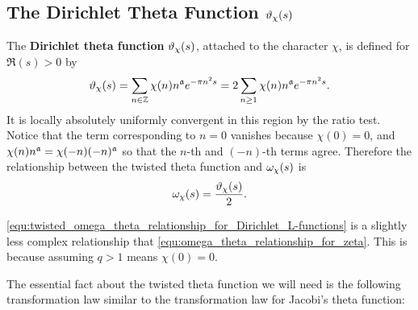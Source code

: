     \subsection*{The Dirichlet Theta Function \texorpdfstring{$\vartheta_{\chi}(s)$}{\vt_{\chi}(s)}}
      The \textbf{Dirichlet theta function} $\vartheta_{\chi}(s)$, attached to the character $\chi$, is defined for $\Re(s) > 0$ by
      \[
        \vartheta_{\chi}(s) = \sum_{n \in \mathbb{Z}}\chi(n)n^{\mathfrak{a}}e^{-\pi n^{2}s} = 2\sum_{n \ge 1}\chi(n)n^{\mathfrak{a}}e^{-\pi n^{2}s}.
      \]
      It is locally absolutely uniformly convergent in this region by the ratio test. Notice that the term corresponding to $n = 0$ vanishes because $\chi(0) = 0$, and $\chi(n)n^{\mathfrak{a}} = \chi(-n)(-n)^{\mathfrak{a}}$ so that the $n$-th and $(-n)$-th terms agree. Therefore the relationship between the twisted theta function and $\omega_{\chi}(s)$ is
      \begin{equation}\label{equ:twisted_omega_theta_relationship_for_Dirichlet_L-functions}
        \omega_{\chi}(s) = \frac{\vartheta_{\chi}(s)}{2}.
      \end{equation}

      \begin{remark}
        \cref{equ:twisted_omega_theta_relationship_for_Dirichlet_L-functions} is a slightly less complex relationship that \cref{equ:omega_theta_relationship_for_zeta}. This is because assuming $q > 1$ means $\chi(0) = 0$.
      \end{remark}

      The essential fact about the twisted theta function we will need is the following transformation law similar to the transformation law for Jacobi's theta function:

